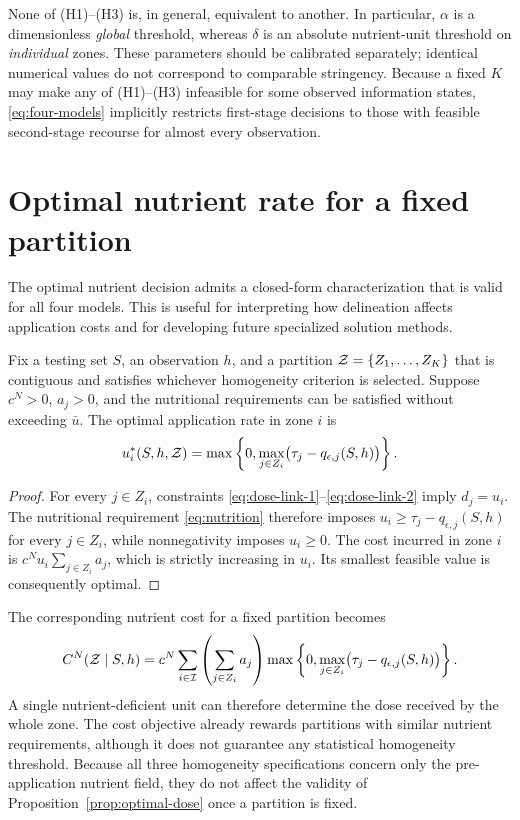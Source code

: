 None of (H1)--(H3) is, in general, equivalent to another. In
particular, $\alpha$ is a dimensionless \emph{global} threshold, whereas
$\delta$ is an absolute nutrient-unit threshold on \emph{individual}
zones. These parameters should be calibrated separately; identical
numerical values do not correspond to comparable stringency. Because a
fixed $K$ may make any of (H1)--(H3) infeasible for some observed
information states, \eqref{eq:four-models} implicitly restricts
first-stage decisions to those with feasible second-stage recourse for
almost every observation.

\section{Optimal nutrient rate for a fixed partition}
\label{sec:optimal-dose}

The optimal nutrient decision admits a closed-form characterization
that is valid for all four models. This is useful for interpreting
how delineation affects application costs and for developing future
specialized solution methods.

\begin{proposition}\label{prop:optimal-dose}
Fix a testing set $S$, an observation $h$, and a partition
$\mathcal{Z}=\{Z_1,\ldots,Z_K\}$ that is contiguous and satisfies whichever
homogeneity criterion is selected. Suppose $c^N>0$, $a_j>0$,
and the nutritional requirements can be satisfied without exceeding
$\bar u$. The optimal application rate in zone $i$ is
\begin{equation}
 u_i^*(S,h,\mathcal{Z})
 =\max\left\{0,\max_{j\in Z_i}
        \bigl(\tau_j-q_{\epsilon,j}(S,h)\bigr)\right\}.
 \label{eq:closed-form-dose}
\end{equation}
\end{proposition}

\begin{proof}
For every $j\in Z_i$, constraints
\eqref{eq:dose-link-1}--\eqref{eq:dose-link-2} imply $d_j=u_i$.
The nutritional requirement \eqref{eq:nutrition} therefore imposes
$u_i\geq\tau_j-q_{\epsilon,j}(S,h)$ for every $j\in Z_i$,
while nonnegativity imposes $u_i\geq0$. The cost incurred in zone $i$
is $c^Nu_i\sum_{j\in Z_i}a_j$, which is strictly increasing in
$u_i$. Its smallest feasible value is consequently optimal.
\end{proof}

The corresponding nutrient cost for a fixed partition becomes
\begin{equation}
 C^N(\mathcal{Z}\mid S,h)
 =c^N\sum_{i\in\mathcal{I}}\left(\sum_{j\in Z_i}a_j\right)
  \max\left\{0,\max_{j\in Z_i}
       \bigl(\tau_j-q_{\epsilon,j}(S,h)\bigr)\right\}.
 \label{eq:partition-cost}
\end{equation}
A single nutrient-deficient unit can therefore determine the dose
received by the whole zone. The cost objective already rewards
partitions with similar nutrient requirements, although it does not
guarantee any statistical homogeneity threshold. Because all three
homogeneity specifications concern only the pre-application nutrient
field, they do not affect the validity of
Proposition~\ref{prop:optimal-dose} once a partition is fixed.

